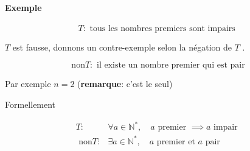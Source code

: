 \documentclass[
    11pt,
    a4paper,
    oneside,
    headinlcude, footinclude,
    twoside,
]{report}
\begin{document}
\paragraph{Exemple}

$$T : \text{ tous les nombres premiers sont impairs }$$

$T$ est fausse, donnons un contre-exemple selon la négation de $T$ .

$$ \text{ non}T: \text{ il existe un nombre premier qui est pair }$$

Par exemple $n=2$ (\textbf{remarque}: c'est le seul)

Formellement

\[
    \begin{split}
        T:& \forall a \in \mathbb{N}^{*}, \quad a \text{ premier } \implies a \text{ impair }\\
        \text{ non}T:& \exists a \in \mathbb{N}^{*}, \quad a \text{ premier et } a \text{ pair }\\
    \end{split}
\]
\end{document}
